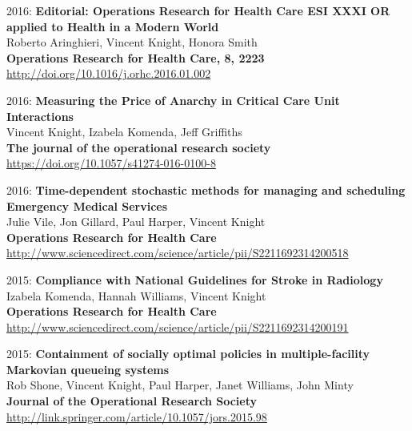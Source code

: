 \documentclass[10pt]{article}
\begin{document}
\begin{etaremune}
\item
  2016: \textbf{Editorial: Operations Research for Health Care ESI XXXI  OR applied to Health in a Modern World}\\
  Roberto Aringhieri, Vincent Knight, Honora Smith\\
  \textbf{Operations Research for Health Care, 8, 2223}\\
  \url{http://doi.org/10.1016/j.orhc.2016.01.002}\\
  

\item
  2016: \textbf{Measuring the Price of Anarchy in Critical Care Unit Interactions}\\
  Vincent Knight, Izabela Komenda, Jeff Griffiths\\
  \textbf{The journal of the operational research society}\\
  \url{https://doi.org/10.1057/s41274-016-0100-8}\\
  

\item
  2016: \textbf{Time-dependent stochastic methods for managing and scheduling Emergency Medical Services}\\
  Julie Vile, Jon Gillard, Paul Harper, Vincent Knight\\
  \textbf{Operations Research for Health Care}\\
  \url{http://www.sciencedirect.com/science/article/pii/S2211692314200518}\\
  

\item
  2015: \textbf{Compliance with National Guidelines for Stroke in Radiology}\\
  Izabela Komenda, Hannah Williams, Vincent Knight\\
  \textbf{Operations Research for Health Care}\\
  \url{http://www.sciencedirect.com/science/article/pii/S2211692314200191}\\
  

\item
  2015: \textbf{Containment of socially optimal policies in multiple-facility Markovian queueing systems}\\
  Rob Shone, Vincent Knight, Paul Harper, Janet Williams, John Minty\\
  \textbf{Journal of the Operational Research Society}\\
  \url{http://link.springer.com/article/10.1057/jors.2015.98}\\
  


\end{etaremune}
\end{document}

